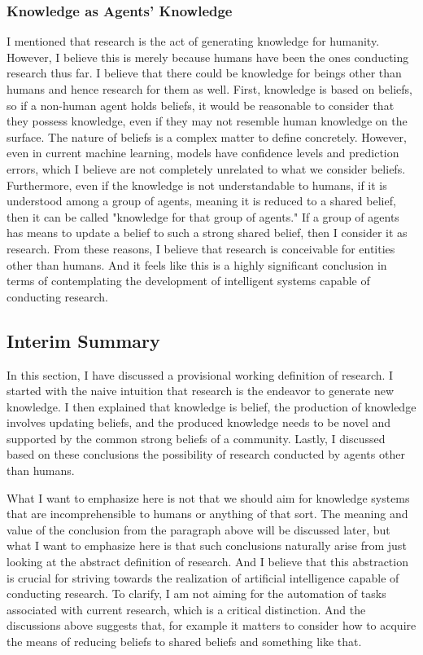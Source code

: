 \documentclass{book}
\begin{document}
\subsubsection{Knowledge as Agents' Knowledge}
I mentioned that research is the act of generating knowledge for humanity. However, I believe this is merely because humans have been the ones conducting research thus far. I believe that there could be knowledge for beings other than humans and hence research for them as well. First, knowledge is based on beliefs, so if a non-human agent holds beliefs, it would be reasonable to consider that they possess knowledge, even if they may not resemble human knowledge on the surface. The nature of beliefs is a complex matter to define concretely. However, even in current machine learning, models have confidence levels and prediction errors, which I believe are not completely unrelated to what we consider beliefs. Furthermore, even if the knowledge is not understandable to humans, if it is understood among a group of agents, meaning it is reduced to a shared belief, then it can be called "knowledge for that group of agents." If a group of agents has means to update a belief to such a strong shared belief, then I consider it as research. From these reasons, I believe that research is conceivable for entities other than humans. And it feels like this is a highly significant conclusion in terms of contemplating the development of intelligent systems capable of conducting research.

\subsection{Interim Summary}
In this section, I have discussed a provisional working definition of research. I started with the naive intuition that research is the endeavor to generate new knowledge. I then explained that knowledge is belief, the production of knowledge involves updating beliefs, and the produced knowledge needs to be novel and supported by the common strong beliefs of a community. Lastly, I discussed based on these conclusions the possibility of research conducted by agents other than humans.

What I want to emphasize here is not that we should aim for knowledge systems that are incomprehensible to humans or anything of that sort. The meaning and value of the conclusion from the paragraph above will be discussed later, but what I want to emphasize here is that such conclusions naturally arise from just looking at the abstract definition of research. And I believe that this abstraction is crucial for striving towards the realization of artificial intelligence capable of conducting research. To clarify, I am not aiming for the automation of tasks associated with current research, which is a critical distinction. And the discussions above suggests that, for example it matters to consider how to acquire the means of reducing beliefs to shared beliefs and something like that. 
\end{document}
